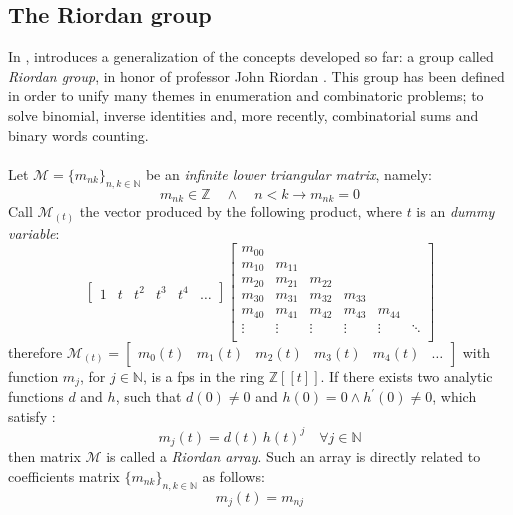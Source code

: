 
\subsection{The Riordan group}

In \cite{shapiro:1991}, \citeauthor{shapiro:1991} introduces a
generalization of the concepts developed so far: a group called 
\emph{Riordan group}, in honor of professor John Riordan
.
This group has been defined in order to unify many themes in 
enumeration and combinatoric problems; to solve binomial, 
inverse identities and, more recently, combinatorial
sums and binary words counting. 
\\\\
Let $\mathcal{M}=\lbrace m_{nk}\rbrace_{n,k\in\mathbb{N}}$ be an \emph{infinite
lower triangular matrix}, namely:
\begin{displaymath}
     m_{nk}\in\mathbb{Z} \quad\wedge\quad n < k \rightarrow m_{nk} = 0
\end{displaymath}
Call $\mathcal{M}_{(t)}$ the vector produced by the following product, 
where $t$ is an \emph{dummy variable}:
\begin{displaymath}
    \left[
        \begin{array}{cccccc}
            1 & t & t^{2} & t^{3} & t^{4} &\ldots
        \end{array}
    \right]
    \left[
        \begin{array}{cccccc}
            m_{00} & & & &  &\\
            m_{10} & m_{11} & & &  &\\
            m_{20} & m_{21}& m_{22}& &  &\\
            m_{30} & m_{31}& m_{32}& m_{33}&  &\\
            m_{40} & m_{41}& m_{42}& m_{43}& m_{44} &\\
            \vdots & \vdots& \vdots& \vdots& \vdots & \ddots\\
        \end{array}
    \right]
\end{displaymath}
therefore $\mathcal{M}_{(t)} =
    \left[
        \begin{array}{cccccc}
            m_{0}(t) & m_{1}(t) & m_{2}(t) & m_{3}(t) &m_{4}(t) & \ldots
        \end{array}
    \right]$ 
with function $m_{j}$, for $j\in\mathbb{N}$, is a \ac{fps} in the ring 
$\mathbb{Z}[\![t]\!]$. If there exists two analytic functions $d$
and $h$, such that $d(0)\neq0$ and $h(0)=0 \wedge h^{\prime}(0)\neq0$, which
satisfy :
\begin{displaymath}
    m_{j}(t)=d(t)\,h(t)^{j} \quad \forall j\in\mathbb{N}
\end{displaymath}
then matrix $\mathcal{M}$ is called a \emph{Riordan array}. Such an array is
directly related to coefficients matrix $\lbrace m_{nk}\rbrace_{n,k\in\mathbb{N}}$ as follows:
\begin{displaymath}
    [t^{n}]m_{j}(t)=m_{nj}
\end{displaymath}


